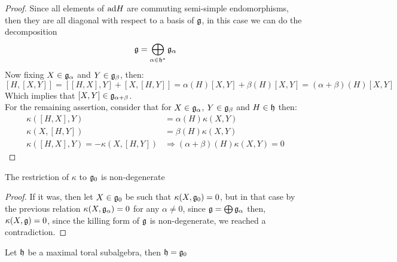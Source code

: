 \begin{proof}
	Since all elements of $\text{ad} H$ are commuting semi-simple endomorphisms, then they are all diagonal with respect to a basis of $\mathfrak{g}$, in this case we can do the decomposition 
	$$\mathfrak{g} = \bigoplus_{\alpha \in \mathfrak{h}^*} \mathfrak{g}_\alpha$$
	Now fixing $X \in \mathfrak{g}_\alpha$ and $Y \in \mathfrak{g}_\beta$, then:
	$$[H,[X,Y]] = [[H,X],Y]+[X,[H,Y]] = \alpha(H) [X,Y] + \beta(H) [X,Y] = (\alpha+\beta)(H)[X,Y]$$
	Which implies that $[X,Y] \in \mathfrak{g}_{\alpha+\beta}$.\\
	For the remaining assertion, consider that for $X \in \mathfrak{g}_\alpha$, $Y \in \mathfrak{g}_\beta$ and $H \in \mathfrak{h}$ then:
	\begin{align*}
	\kappa([H,X],Y)&=\alpha(H)\kappa(X,Y)\\
	\kappa(X,[H,Y])&=\beta(H)\kappa(X,Y)\\
	\kappa([H,X],Y) = -\kappa(X,[H,Y]) &\Rightarrow (\alpha + \beta)(H)\kappa(X,Y) = 0
	\end{align*}
\end{proof}
\begin{corol}
	The restriction of $\kappa$ to $\mathfrak{g}_0$ is non-degenerate
	\label{g0killingnondeg}
\end{corol}
\begin{proof}
	If it was, then let $X \in \mathfrak{g}_0$ be such that $\kappa(X,\mathfrak{g}_0)=0$, but in that case by the previous relation $\kappa(X,\mathfrak{g}_\alpha) =0$ for any $\alpha\not=0$, since $\mathfrak{g}= \bigoplus \mathfrak{g}_\alpha$ then, $\kappa(X,\mathfrak{g})=0$, since the killing form of $\mathfrak{g}$ is non-degenerate, we reached a contradiction.
\end{proof}
\begin{teo}
	Let $\mathfrak{h}$ be a maximal toral subalgebra, then $\mathfrak{h}=\mathfrak{g}_0$
	\label{hg0}
\end{teo}
